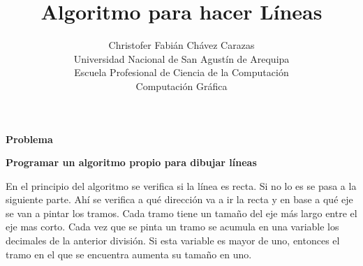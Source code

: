 \documentclass[a4paper,12pt]{article}
\begin{document}
\title{Algoritmo para hacer Líneas}
\author{
Christofer Fabián Chávez Carazas \\
\small{Universidad Nacional de San Agustín de Arequipa} \\
\small{Escuela Profesional de Ciencia de la Computación} \\
\small{Computación Gráfica}
}
\date{}

\maketitle

\begin{large}
 \textbf{Problema}
\end{large}

\textbf{Programar un algoritmo propio para dibujar líneas}

En el principio del algoritmo se verifica si la línea es recta. Si no lo es se pasa a la siguiente parte.
Ahí se verifica a qué dirección va a ir la recta y en base a qué eje se van a pintar los tramos.
Cada tramo tiene un tamaño del eje más largo entre el eje mas corto. Cada vez que se pinta un tramo
se acumula en una variable los decimales de la anterior división. Si esta variable es mayor de uno, entonces
el tramo en el que se encuentra aumenta su tamaño en uno.
\end{document}
